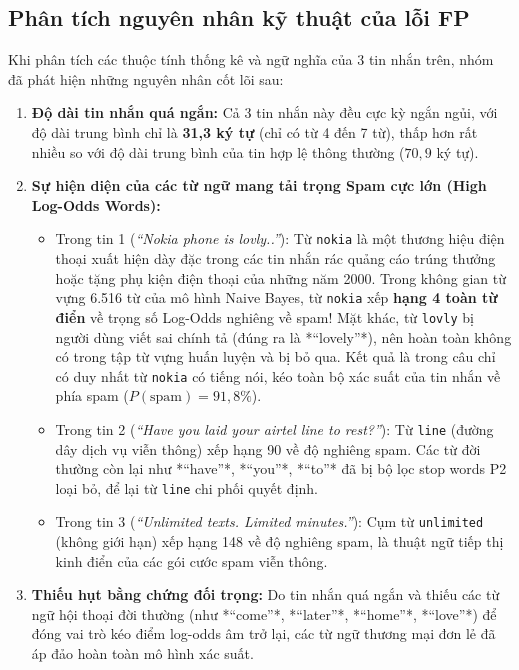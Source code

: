 \subsection{Phân tích nguyên nhân kỹ thuật của lỗi FP}
Khi phân tích các thuộc tính thống kê và ngữ nghĩa của 3 tin nhắn trên, nhóm đã phát hiện những nguyên nhân cốt lõi sau:
\begin{enumerate}
    \item \textbf{Độ dài tin nhắn quá ngắn:}
    Cả 3 tin nhắn này đều cực kỳ ngắn ngủi, với độ dài trung bình chỉ là \textbf{31,3 ký tự} (chỉ có từ 4 đến 7 từ), thấp hơn rất nhiều so với độ dài trung bình của tin hợp lệ thông thường ($70,9$ ký tự).
    \item \textbf{Sự hiện diện của các từ ngữ mang tải trọng Spam cực lớn (High Log-Odds Words):}
    \begin{itemize}
        \item Trong tin 1 (\textit{“Nokia phone is lovly..”}): Từ \texttt{nokia} là một thương hiệu điện thoại xuất hiện dày đặc trong các tin nhắn rác quảng cáo trúng thưởng hoặc tặng phụ kiện điện thoại của những năm 2000. Trong không gian từ vựng 6.516 từ của mô hình Naive Bayes, từ \texttt{nokia} xếp \textbf{hạng 4 toàn từ điển} về trọng số Log-Odds nghiêng về spam! Mặt khác, từ \texttt{lovly} bị người dùng viết sai chính tả (đúng ra là *“lovely”*), nên hoàn toàn không có trong tập từ vựng huấn luyện và bị bỏ qua. Kết quả là trong câu chỉ có duy nhất từ \texttt{nokia} có tiếng nói, kéo toàn bộ xác suất của tin nhắn về phía spam ($P(\text{spam}) = 91,8\%$).
        \item Trong tin 2 (\textit{“Have you laid your airtel line to rest?”}): Từ \texttt{line} (đường dây dịch vụ viễn thông) xếp hạng 90 về độ nghiêng spam. Các từ đời thường còn lại như *“have”*, *“you”*, *“to”* đã bị bộ lọc stop words P2 loại bỏ, để lại từ \texttt{line} chi phối quyết định.
        \item Trong tin 3 (\textit{“Unlimited texts. Limited minutes.”}): Cụm từ \texttt{unlimited} (không giới hạn) xếp hạng 148 về độ nghiêng spam, là thuật ngữ tiếp thị kinh điển của các gói cước spam viễn thông.
    \end{itemize}
    \item \textbf{Thiếu hụt bằng chứng đối trọng:} Do tin nhắn quá ngắn và thiếu các từ ngữ hội thoại đời thường (như *“come”*, *“later”*, *“home”*, *“love”*) để đóng vai trò kéo điểm log-odds âm trở lại, các từ ngữ thương mại đơn lẻ đã áp đảo hoàn toàn mô hình xác suất.
\end{enumerate}

